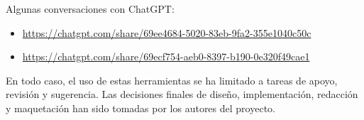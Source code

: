 Algunas conversaciones con ChatGPT:
\begin{itemize}
    \item \url{https://chatgpt.com/share/69ee4684-5020-83eb-9fa2-355e1040c50c}
    \item \url{https://chatgpt.com/share/69ecf754-aeb0-8397-b190-0e320f49cae1}
\end{itemize}

En todo caso, el uso de estas herramientas se ha limitado a tareas de apoyo, revisión y sugerencia. Las decisiones 
finales de diseño, implementación, redacción y maquetación han sido tomadas por los autores del proyecto.

